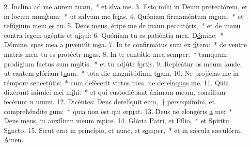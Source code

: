 2. Inclína ad me aurem t\uline{u}am,~* et slv\uline{a} me.
3. Esto mihi in Deum protectórem, et in locum mun\uline{í}tum:~* ut salvum me fc\uline{i}as.
4. Quóniam firmaméntum m\uline{e}um,~* et refúgium mem \uline{e}s tu.
5. Deus meus, éripe me de manu peccat\uline{ó}ris,~* et de manu contra legem agéntis et n\uline{í}qui:
6. Quóniam tu es patiéntia mea, D\uline{ó}mine:~* Dómine, spes mea a juventút m\uline{e}a.
7. In te confirmátus sum ex \uline{ú}tero:~* de ventre matris meæ tu es protéctr m\uline{e}us.
8. In te cantátio mea semper:~† tamquam prodígium factus sum m\uline{u}ltis:~* et tu adjútr f\uline{o}rtis.
9. Repleátur os meum laude, ut cantem glóriam t\uline{u}am:~* tota die magnitúdinm t\uline{u}am.
10. Ne projícias me in témpore senect\uline{ú}tis:~* cum defécerit virtus mea, ne dereln\uline{qua}s me.
11. Quia dixérunt inimíci mei m\uline{i}hi:~* et qui custodiébant ánimam meam, consílium fecérunt n \uline{u}num.
12. Dicéntes: Deus derelíquit eum,~† persequímini, et comprehéndite \uline{e}um:~* quia non est qui erp\uline{i}at.
13. Deus ne elongéris \uline{a} me:~* Deus meus, in auxílium meum rsp\uline{i}ce.
14. Glória Patri, et F\uline{í}lio,~* et Spirítu S\uline{a}ncto.
15. Sicut erat in princípio, et nunc, et s\uline{e}mper,~* et in sǽcula sæculórm. \uline{A}men.

